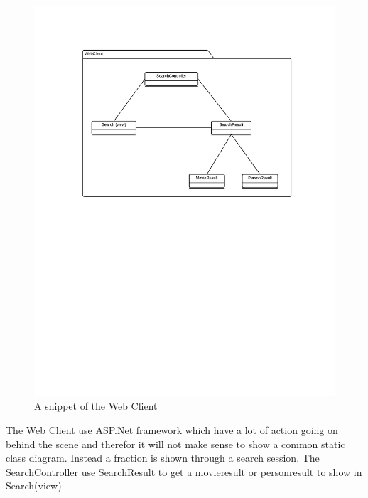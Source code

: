 \begin{figure}[H]
\includegraphics[scale=0.2]{img/SDD/WebClientSubsystemSnippet.png}
\caption{A snippet of the Web Client}
\label{fig:WebClientSubsystem}
\end{figure}

The Web Client use ASP.Net framework which have a lot of action going on behind the scene and therefor it will not make sense to show a common static class diagram. Instead  a fraction is shown through a search session. The SearchController use SearchResult to get a movieresult or personresult to show in Search(view)\\



